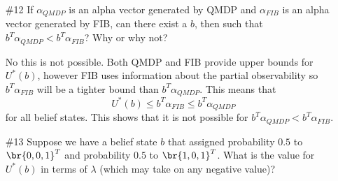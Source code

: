 \documentclass[12pt, oneside]{article}
\begin{document}
\begin{enumerate}
  \item[\#12] %
    If $\alpha_{QMDP}$ is an alpha vector generated by QMDP and $\alpha_{FIB}$
    is an alpha vector generated by FIB, can there exist a $b$, then such that
    $b^T \alpha_{QMDP} < b^T \alpha_{FIB}$?
    Why or why not?

    No this is not possible.
    Both QMDP and FIB provide upper bounds for $U^*(b)$, however FIB uses
    information about the partial observability so $b^T \alpha_{FIB}$ will be a
    tighter bound than $b^T \alpha_{QMDP}$.
    This means that
    \[
      U^*(b) \le b^T \alpha_{FIB} \le b^T \alpha_{QMDP}
    \]
    for all belief states.
    This shows that it is not possible for
    $b^T \alpha_{QMDP} < b^T \alpha_{FIB}$.

  \item[\#13] %
    Suppose we have a belief state $b$ that assigned probability $0.5$ to
    $\br{0, 0, 1}^T$ and probability $0.5$ to $\br{1, 0, 1}^T$.
    What is the value for $U^*(b)$ in terms of $\lambda$ (which may take on any
    negative value)?


\end{enumerate}
\end{document}
